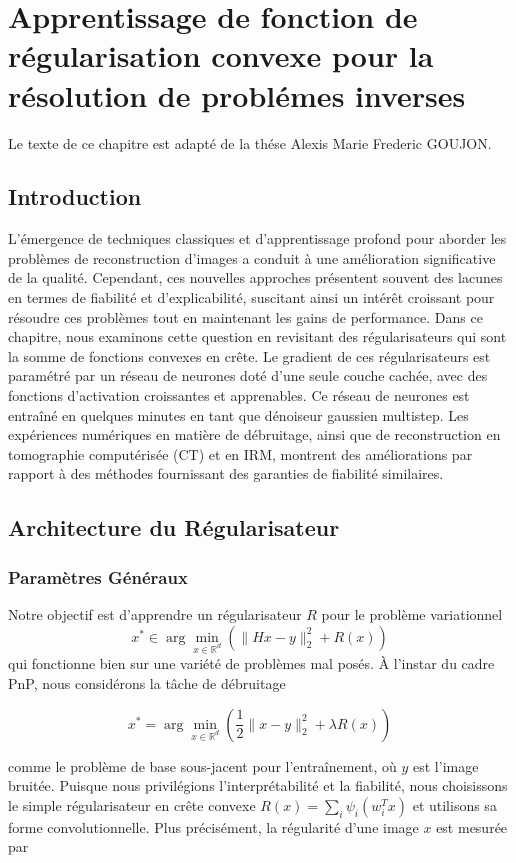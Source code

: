 \documentclass[a4paper, 12pt]{report} %
\begin{document}
\newpage

\chapter{Apprentissage de fonction de régularisation convexe pour la résolution de problémes inverses}
Le texte de ce chapitre est adapté de la thése Alexis Marie Frederic GOUJON.
\section*{Introduction}
L'émergence de techniques classiques et d'apprentissage profond pour aborder les problèmes de reconstruction d'images a conduit à une amélioration significative de la qualité. Cependant, ces nouvelles approches présentent souvent des lacunes en termes de fiabilité et d'explicabilité, suscitant ainsi un intérêt croissant pour résoudre ces problèmes tout en maintenant les gains de performance. Dans ce chapitre, nous examinons cette question en revisitant des régularisateurs qui sont la somme de fonctions convexes en crête. Le gradient de ces régularisateurs est paramétré par un réseau de neurones doté d'une seule couche cachée, avec des fonctions d'activation croissantes et apprenables. Ce réseau de neurones est entraîné en quelques minutes en tant que dénoiseur gaussien multistep. Les expériences numériques en matière de débruitage, ainsi que de reconstruction en tomographie computérisée (CT) et en IRM, montrent des améliorations par rapport à des méthodes fournissant des garanties de fiabilité similaires.
\section{Architecture du Régularisateur}
\subsection{Paramètres Généraux}
Notre objectif est d'apprendre un régularisateur \( R \) pour le problème variationnel \[
x^* \in \arg \min_{x \in \mathbb{R}^d} \left( \| Hx - y \|_2^2 + R(x) \right)
\] qui fonctionne bien sur une variété de problèmes mal posés. À l'instar du cadre PnP, nous considérons la tâche de débruitage 

\[
x^* = \arg \min_{x \in \mathbb{R}^d} \left( \frac{1}{2} \| x - y \|_2^2 + \lambda R(x) \right)
\]

comme le problème de base sous-jacent pour l'entraînement, où \( y \) est l'image bruitée. Puisque nous privilégions l'interprétabilité et la fiabilité, nous choisissons le simple régularisateur en crête convexe $R(x) = \sum_{i} \psi_i(w_i^T x)$ et utilisons sa forme convolutionnelle. Plus précisément, la régularité d'une image \( x \) est mesurée par 
\end{document}
